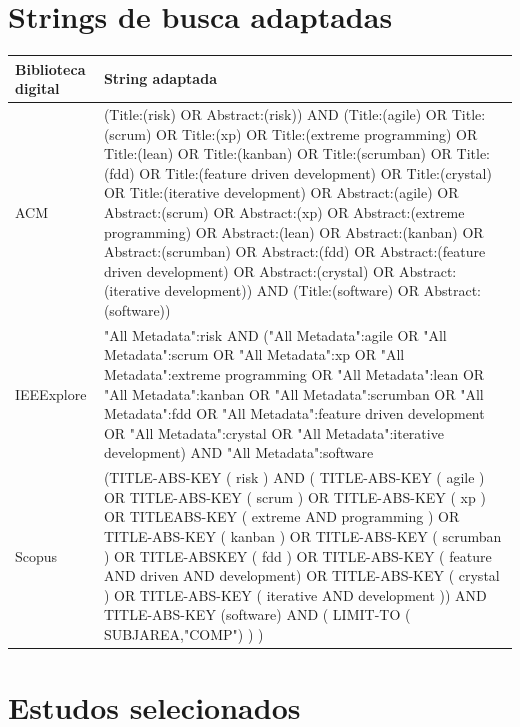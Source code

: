 \documentclass[
	12pt,
	openright,
	twoside,
	a4paper,
	english,
	brazil
	]{abntex2}
\begin{document}
\appendix

\chapter{Strings de busca adaptadas}\label{apendiceA}

\vspace{-2em} %

\begin{table}[h!]
  \centering
  \begin{tabular}{|l|p{12cm}|}
    \hline
    \textbf{Biblioteca digital} & \textbf{String adaptada} \\
    \hline
    ACM & (Title:(risk) OR Abstract:(risk)) AND (Title:(agile) OR Title:(scrum) OR Title:(xp) OR Title:(extreme programming) OR Title:(lean) OR Title:(kanban) OR Title:(scrumban) OR Title:(fdd) OR Title:(feature driven development) OR Title:(crystal) OR Title:(iterative development) OR Abstract:(agile) OR Abstract:(scrum) OR Abstract:(xp) OR Abstract:(extreme programming) OR Abstract:(lean) OR Abstract:(kanban) OR Abstract:(scrumban) OR Abstract:(fdd) OR Abstract:(feature driven development) OR Abstract:(crystal) OR Abstract:(iterative development)) AND (Title:(software) OR Abstract:(software)) \\
    \hline
    IEEExplore & "All Metadata":risk AND ("All Metadata":agile OR "All Metadata":scrum OR "All Metadata":xp OR "All Metadata":extreme programming OR "All Metadata":lean OR "All Metadata":kanban OR "All Metadata":scrumban OR "All Metadata":fdd OR "All Metadata":feature driven development OR "All Metadata":crystal OR "All Metadata":iterative development) AND "All Metadata":software \\
    \hline
    Scopus & (TITLE-ABS-KEY ( risk ) AND ( TITLE-ABS-KEY ( agile ) OR TITLE-ABS-KEY ( scrum ) OR TITLE-ABS-KEY ( xp ) OR TITLEABS-KEY ( extreme AND programming ) OR TITLE-ABS-KEY ( kanban ) OR TITLE-ABS-KEY ( scrumban ) OR TITLE-ABSKEY ( fdd ) OR TITLE-ABS-KEY ( feature AND driven AND development) OR TITLE-ABS-KEY ( crystal ) OR TITLE-ABS-KEY ( iterative AND development )) AND TITLE-ABS-KEY (software) AND ( LIMIT-TO ( SUBJAREA,"COMP") ) ) \\
    \hline
  \end{tabular}
\end{table}


\chapter{Estudos selecionados}
\label{apendiceB}
\end{document}
